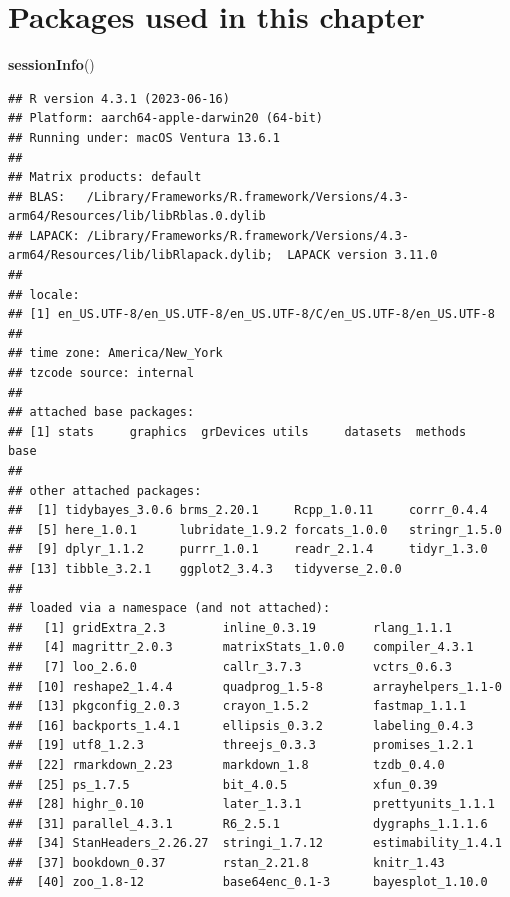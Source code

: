 \documentclass[
]{book}
\newenvironment{Shaded}{\begin{snugshade}}{\end{snugshade}}
\newcommand{\FunctionTok}[1]{\textcolor[rgb]{0.13,0.29,0.53}{\textbf{#1}}}
\newcommand{\NormalTok}[1]{#1}
\begin{document}
\section{Packages used in this chapter}\label{packages-used-in-this-chapter-3}

\begin{Shaded}
\begin{Highlighting}[]
\FunctionTok{sessionInfo}\NormalTok{()}
\end{Highlighting}
\end{Shaded}

\begin{verbatim}
## R version 4.3.1 (2023-06-16)
## Platform: aarch64-apple-darwin20 (64-bit)
## Running under: macOS Ventura 13.6.1
## 
## Matrix products: default
## BLAS:   /Library/Frameworks/R.framework/Versions/4.3-arm64/Resources/lib/libRblas.0.dylib 
## LAPACK: /Library/Frameworks/R.framework/Versions/4.3-arm64/Resources/lib/libRlapack.dylib;  LAPACK version 3.11.0
## 
## locale:
## [1] en_US.UTF-8/en_US.UTF-8/en_US.UTF-8/C/en_US.UTF-8/en_US.UTF-8
## 
## time zone: America/New_York
## tzcode source: internal
## 
## attached base packages:
## [1] stats     graphics  grDevices utils     datasets  methods   base     
## 
## other attached packages:
##  [1] tidybayes_3.0.6 brms_2.20.1     Rcpp_1.0.11     corrr_0.4.4    
##  [5] here_1.0.1      lubridate_1.9.2 forcats_1.0.0   stringr_1.5.0  
##  [9] dplyr_1.1.2     purrr_1.0.1     readr_2.1.4     tidyr_1.3.0    
## [13] tibble_3.2.1    ggplot2_3.4.3   tidyverse_2.0.0
## 
## loaded via a namespace (and not attached):
##   [1] gridExtra_2.3        inline_0.3.19        rlang_1.1.1         
##   [4] magrittr_2.0.3       matrixStats_1.0.0    compiler_4.3.1      
##   [7] loo_2.6.0            callr_3.7.3          vctrs_0.6.3         
##  [10] reshape2_1.4.4       quadprog_1.5-8       arrayhelpers_1.1-0  
##  [13] pkgconfig_2.0.3      crayon_1.5.2         fastmap_1.1.1       
##  [16] backports_1.4.1      ellipsis_0.3.2       labeling_0.4.3      
##  [19] utf8_1.2.3           threejs_0.3.3        promises_1.2.1      
##  [22] rmarkdown_2.23       markdown_1.8         tzdb_0.4.0          
##  [25] ps_1.7.5             bit_4.0.5            xfun_0.39           
##  [28] highr_0.10           later_1.3.1          prettyunits_1.1.1   
##  [31] parallel_4.3.1       R6_2.5.1             dygraphs_1.1.1.6    
##  [34] StanHeaders_2.26.27  stringi_1.7.12       estimability_1.4.1  
##  [37] bookdown_0.37        rstan_2.21.8         knitr_1.43          
##  [40] zoo_1.8-12           base64enc_0.1-3      bayesplot_1.10.0    

\end{verbatim}
\end{document}
